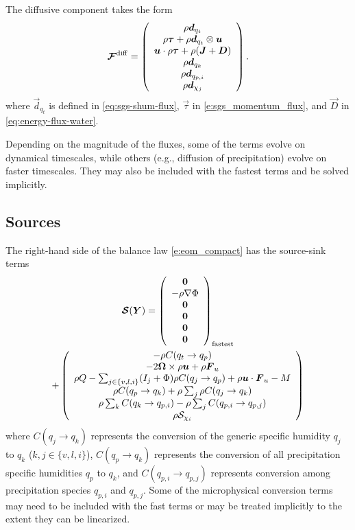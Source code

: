\documentclass{article}
\begin{document}
 The diffusive component takes the form 
 \begin{equation}
 \boldsymbol{{\mathcal{F}}}^{\mathrm{diff}}=\left( \begin{array}{c}
 \rho\boldsymbol{{d}}_{q_t} \\
 \rho\boldsymbol{{\tau}} + \rho\boldsymbol{{d}}_{q_t} \otimes \boldsymbol{{u}}\\
 \boldsymbol{{u}} \cdot \rho\boldsymbol{{\tau}} + \rho (\boldsymbol{{J}} + \boldsymbol{{D}}) \\
\rho\boldsymbol{{d}}_{q_k}\\
\rho \boldsymbol{{d}}_{q_{p, i}}\\
\rho \boldsymbol{{d}}_{\chi_j}
\end{array}
\right).
\label{eq:diff_flux}
\end{equation}
where $\vec{d}_{q_t}$ is defined in \eqref{eq:sgs-shum-flux}, $\vec{\tau}$ in \eqref{e:sgs_momentum_flux}, and $\vec{D}$ in \eqref{eq:energy-flux-water}.

Depending on the magnitude of the fluxes, some of the terms evolve on dynamical timescales, while others (e.g., diffusion of precipitation) evolve on faster timescales. They may also be included with the fastest terms and be solved implicitly.
\subsection{Sources}

The right-hand side of the balance law \eqref{e:eom_compact} has the source-sink terms
\begin{multline}
\boldsymbol{{\mathcal{S}}}(\boldsymbol{{Y}})=  \left( 
\begin{array}{c}
 \boldsymbol{{0}} \\
  -\rho \nabla\Phi \\
 \boldsymbol{{0}} \\
\boldsymbol{{0}} \\
\boldsymbol{{0}} \\
\boldsymbol{{0}}
\end{array}
\right)_{\mathrm{fastest}} \\
+ \left( \begin{array}{c}
 -\rho C(q_t \rightarrow q_p) \\
 - 2 \boldsymbol{{\Omega}} \times \rho\boldsymbol{{u}}  + \rho \boldsymbol{{F}}_u \\
 \rho Q - \sum_{j\in\{v,l,i\}} (I_j + \Phi)  \rho C(q_j \rightarrow q_p) + \rho \boldsymbol{{u}} \cdot \boldsymbol{{F}}_u - M \\
\rho C(q_p \rightarrow q_k) + \rho \sum_j \rho C(q_j \rightarrow q_k) \\
\rho \sum_k C(q_k \rightarrow q_{p, i}) - \rho \sum_j C(q_{p, i} \rightarrow q_{p, j})\\
\rho \mathcal{S}_{\chi_i}
\end{array}
\right)
\label{eq:source}
\end{multline}
where $C(q_j \rightarrow q_k)$ represents the conversion of the generic specific humidity $q_j$ to $q_k$ ($k, j \in \{v, l, i\}$), $C(q_p \rightarrow q_k)$ represents the conversion of all precipitation specific humidities $q_p$ to $q_k$, and $C(q_{p, i} \rightarrow q_{p, j})$ represents conversion among precipitation species $q_{p, i}$ and $q_{p, j}$. Some of the microphysical conversion terms may need to be included with the fast terms or may be treated implicitly to the extent they can be linearized.
\end{document}

